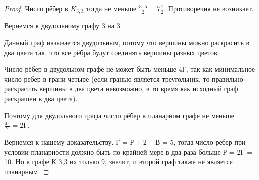 \documentclass[russian]{lecture-notes}
\begin{document}
\begin{proof}
Число рёбер в $K_{3,3}$ тогда не меньше $\frac{3 \cdot 5}{2} = 7 \frac{1}{2}$. Противоречия не возникает.

Вернемся к двудольному графу 3 на 3.

\begin{note}
    Данный граф называется двудольным, потому что вершины можно раскрасить в два цвета так, что все рёбра будут соединять вершины разных цветов.
    
    \begin{figure}[H]
        \centering
    \end{figure}

\end{note}

Число рёбер в двудольном графе не может быть меньше 4Г, так как минимальное число ребер в грани четыре (если гранью является треугольник, то правильно раскрасить вершины в два цвета невозможно, в то время как исходный граф раскрашен в два цвета).

\begin{figure}[H]
    \centering
\end{figure}

Поэтому для двудольного графа число рёбер в планарном графе не меньше  $\frac{4\text{Г}}{2} = 2\text{Г}$.

\begin{figure}[H]
    \centering
\end{figure}

Вернемся к нашему доказательству. $\text{Г = Р +} \ 2 - \text{В = } 5$, тогда число ребер при условии планарности должно быть по крайней мере в два раза больше Р = 2Г = 10. Но в графе К 3,3 их только 9, значит, и второй граф также не является планарным.

\end{proof}
\end{document}
